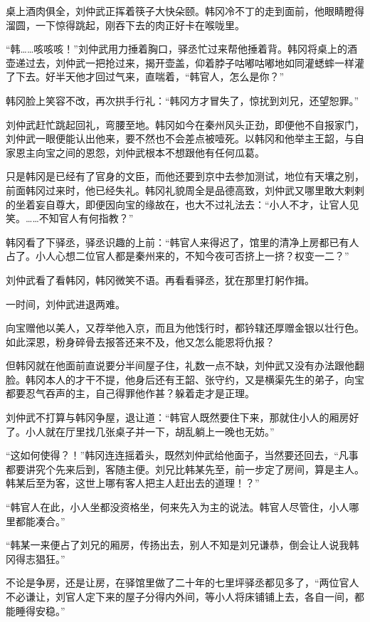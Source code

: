 桌上酒肉俱全，刘仲武正挥着筷子大快朵颐。韩冈冷不丁的走到面前，他眼睛瞪得溜圆，一下惊得跳起，刚吞下去的肉正好卡在喉咙里。

“韩……咳咳咳！”刘仲武用力捶着胸口，驿丞忙过来帮他捶着背。韩冈将桌上的酒壶递过去，刘仲武一把抢过来，揭开壶盖，仰着脖子咕嘟咕嘟地如同灌蟋蟀一样灌了下去。好半天他才回过气来，直喘着，“韩官人，怎么是你？”

韩冈脸上笑容不改，再次拱手行礼：“韩冈方才冒失了，惊扰到刘兄，还望恕罪。”

刘仲武赶忙跳起回礼，弯腰至地。韩冈如今在秦州风头正劲，即便他不自报家门，刘仲武一眼便能认出他来，要不然也不会差点被噎死。以韩冈和他举主王韶，与自家恩主向宝之间的恩怨，刘仲武根本不想跟他有任何瓜葛。

只是韩冈是已经有了官身的文臣，而他还要到京中去参加测试，地位有天壤之别，前面韩冈过来时，他已经失礼。韩冈礼貌周全是品德高致，刘仲武又哪里敢大剌剌的坐着妄自尊大，即便因向宝的缘故在，也大不过礼法去：“小人不才，让官人见笑。……不知官人有何指教？”

韩冈看了下驿丞，驿丞识趣的上前：“韩官人来得迟了，馆里的清净上房都已有人占了。小人心想二位官人都是秦州来的，不知今夜可否挤上一挤？权变一二？”

刘仲武看了看韩冈，韩冈微笑不语。再看看驿丞，犹在那里打躬作揖。

一时间，刘仲武进退两难。

向宝赠他以美人，又荐举他入京，而且为他饯行时，都钤辖还厚赠金银以壮行色。如此深恩，粉身碎骨去报答还来不及，他又怎么能恩将仇报？

但韩冈就在他面前直说要分半间屋子住，礼数一点不缺，刘仲武又没有办法跟他翻脸。韩冈本人的才干不提，他身后还有王韶、张守约，又是横渠先生的弟子，向宝都要忍气吞声的主，自己得罪他作甚？躲着走才是正理。

刘仲武不打算与韩冈争屋，退让道：“韩官人既然要住下来，那就住小人的厢房好了。小人就在厅里找几张桌子并一下，胡乱躺上一晚也无妨。”

“这如何使得？！”韩冈连连摇着头，既然刘仲武给他面子，当然要还回去，“凡事都要讲究个先来后到，客随主便。刘兄比韩某先至，前一步定了房间，算是主人。韩某后至为客，这世上哪有客人把主人赶出去的道理！？”

“韩官人在此，小人坐都没资格坐，何来先入为主的说法。韩官人尽管住，小人哪里都能凑合。”

“韩某一来便占了刘兄的厢房，传扬出去，别人不知是刘兄谦恭，倒会让人说我韩冈得志猖狂。”

不论是争房，还是让房，在驿馆里做了二十年的七里坪驿丞都见多了，“两位官人不必谦让，刘官人定下来的屋子分得内外间，等小人将床铺铺上去，各自一间，都能睡得安稳。”


